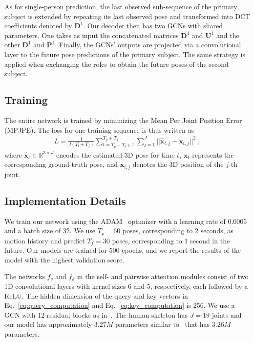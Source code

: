 As for single-person prediction, the last observed sub-sequence of the primary subject is extended by repeating its last observed pose and transformed into DCT coefficients denoted by $\textbf{D}^{1}$. Our decoder then has two GCNs with shared parameters. One takes as input the concatenated matrices $\textbf{D}^{1}$ and $\textbf{U}^{1}$ and the other $\textbf{D}^{1}$ and $\textbf{P}^{1}$. Finally, the GCNs' outputs are projected via a convolutional layer to the future pose predictions of the primary subject. The same strategy is applied when exchanging the roles to obtain the future poses of the second subject.


\subsection{Training}
The entire network is trained by minimizing the Mean Per Joint Position Error (MPJPE). The loss for one training sequence is thus written as
\begin{equation}
\begin{split}
\textit{L} = \frac{1}{J({T}_l+{T}_f)}\sum_{t={T}_p-{T}_l+1}^{{T}_p+{T}_f}\sum_{j=1}^{J} ||\hat{\textbf{x}}_{t, j} - \textbf{x}_{t, j}||^{2}\;,
\end{split}
\end{equation}
where $\hat{\textbf{x}}_{t} \in \mathbb{R}^{3 \times J}$ encodes the estimated 3D pose for time $t$, $\textbf{x}_{t}$ represents the corresponding ground-truth pose, and $\textbf{x}_{t,j}$ denotes the 3D position of the $j$-th joint. 

\subsection{Implementation Details}

 We train our network using the ADAM~\cite{Kingma15} optimizer with a learning rate of $0.0005$ and a batch size of $32$. We use $T_p = 60$ poses, corresponding to 2 seconds, as motion history  and predict $T_f = 30$ poses, corresponding to 1 second in the future. Our models are trained for 500 epochs, and we report the results of the model with the highest validation score.

 The networks $f_q$ and $f_k$ in the self- and pairwise attention modules consist of two 1D convolutional layers with kernel sizes $6$ and $5$, respectively, each followed by a ReLU. The hidden dimension of the query and key vectors in Eq.~\ref{eq:query_computation} and Eq.~\ref{eq:key_computation} is $256$. We use a GCN with $12$ residual blocks as in~\cite{Mao20}. The human skeleton has $J=19$ joints and our model has approximately $3.27M$ parameters similar to~\cite{Mao20} that has $3.26M$ parameters.


